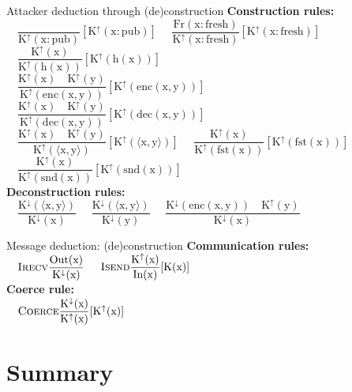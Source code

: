 \documentclass[11pt,aspectratio=169]{beamer}
\begin{document}
\begin{frame}[fragile]{Attacker deduction through (de)construction}
    \textbf{Construction rules:}\\[4mm]
        $\mathrm{\quad \dfrac{}{K^{\uparrow}(x:pub)}[K^{\uparrow}(x:pub)]}$
        $\mathrm{\quad \dfrac{Fr(x:fresh)}{K^{\uparrow}(x:fresh)}[K^{\uparrow}(x:fresh)]}$
        $\mathrm{\quad \dfrac{K^{\uparrow}(x)}{K^{\uparrow}(h(x))}[K^{\uparrow}(h(x))]}$\\[4mm]
        $\mathrm{\quad \dfrac{K^{\uparrow}(x)\quad K^{\uparrow}(y)}{K^{\uparrow}(enc(x,y))}[K^{\uparrow}(enc(x,y))]}$
        $\mathrm{\quad \dfrac{K^{\uparrow}(x)\quad K^{\uparrow}(y)}{K^{\uparrow}(dec(x,y))}[K^{\uparrow}(dec(x,y))]}$\\[4mm]
        $\mathrm{\quad \dfrac{K^{\uparrow}(x)\quad K^{\uparrow}(y)}{K^{\uparrow}(\langle x,y \rangle)}[K^{\uparrow}(\langle x,y \rangle)]}$
        $\mathrm{\quad \dfrac{K^{\uparrow}(x)}{K^{\uparrow}(fst(x))}[K^{\uparrow}(fst(x))]}$
        $\mathrm{\quad \dfrac{K^{\uparrow}(x)}{K^{\uparrow}(snd(x))}[K^{\uparrow}(snd(x))]}$\\[4mm]
    \textbf{Deconstruction rules:}\\[4mm]
        $\mathrm{\quad \dfrac{K^{\downarrow}(\langle x,y \rangle)}{K^{\downarrow}(x)}}$
        $\mathrm{\quad \dfrac{K^{\downarrow}(\langle x,y \rangle)}{K^{\downarrow}(y)}}$
        $\mathrm{\quad \dfrac{K^{\downarrow}(enc(x,y))\quad K^{\uparrow}(y)}{K^{\downarrow}(x)}}$\\[4mm]
\end{frame}

\begin{frame}[fragile]{Message deduction: (de)construction}
    \textbf{Communication rules:}\\[4mm]
        $\mathrm{\quad \textsc{Irecv}\dfrac{Out(x)}{K^{\downarrow}(x)}}$
        $\mathrm{\quad \textsc{Isend}\dfrac{K^{\uparrow}(x)}{In(x)}[K(x)]}$\\[4mm]
    \textbf{Coerce rule:}\\[4mm]
        $\mathrm{\quad \textsc{Coerce}\dfrac{K^{\downarrow}(x)}{K^{\uparrow}(x)}[K^{\uparrow}(x)]}$
\end{frame}


\section*{Summary}
\end{document}
